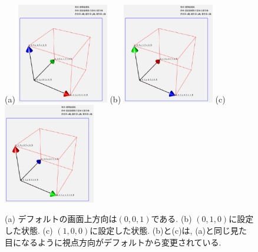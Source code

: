 \documentclass[platex,a4paper,12pt]{jsarticle}%
\begin{document}
\begin{figure}[htb]
\centering
(a)
\includegraphics[width=40mm]{g_vision_up_01.eps}
(b)
\includegraphics[width=40mm]{g_vision_up_02.eps}
(c)
\includegraphics[width=40mm]{g_vision_up_03.eps}

\begin{flushleft}
(a) デフォルトの画面上方向は$(0, 0, 1)$である.
(b) $(0, 1, 0)$に設定した状態. 
(c) $(1, 0, 0)$に設定した状態. 
(b)と(c)は, (a)と同じ見た目になるように視点方向がデフォルトから変更されている.
\end{flushleft}
\end{figure}
\end{document}

